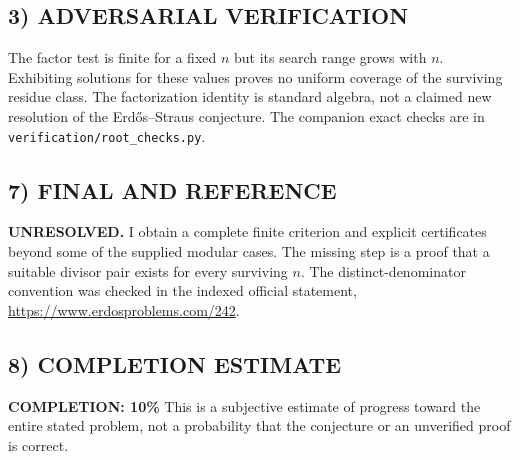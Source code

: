 \subsection*{3) ADVERSARIAL VERIFICATION}
The factor test is finite for a fixed $n$ but its search range grows with
$n$. Exhibiting solutions for these values proves no uniform coverage of
the surviving residue class. The factorization identity is standard algebra,
not a claimed new resolution of the Erd\H{o}s--Straus conjecture.
The companion exact checks are in \texttt{verification/root\_checks.py}.

\subsection*{7) FINAL AND REFERENCE}
\textbf{UNRESOLVED.} I obtain a complete finite criterion and explicit
certificates beyond some of the supplied modular cases. The missing step
is a proof that a suitable divisor pair exists for every surviving $n$.
The distinct-denominator convention was checked in the indexed official
statement, \url{https://www.erdosproblems.com/242}.

\subsection*{8) COMPLETION ESTIMATE}
\textbf{COMPLETION: 10\%}
This is a subjective estimate of progress toward the entire stated problem, not a probability that the conjecture or an unverified proof is correct.
